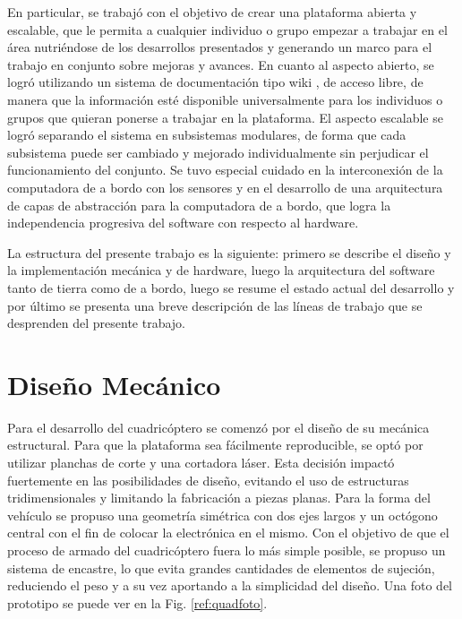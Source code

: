 \documentclass[a4paper, conference]{IEEEtran}
\begin{document}
En particular, se trabajó con el objetivo de crear una plataforma abierta y escalable, que le permita a cualquier individuo o grupo empezar a trabajar en el área nutriéndose de los desarrollos presentados y generando un marco para el trabajo en conjunto sobre mejoras y avances. En cuanto al aspecto abierto, se logró utilizando un sistema de documentación tipo wiki \cite{wiki}, de acceso libre, de manera que la información esté disponible universalmente para los individuos o grupos que quieran ponerse a trabajar en la plataforma. El aspecto escalable se logró separando el sistema en subsistemas modulares, de forma que cada subsistema puede ser cambiado y mejorado individualmente sin perjudicar el funcionamiento del conjunto. Se tuvo especial cuidado en la interconexión de la computadora de a bordo con los sensores y en el desarrollo de una arquitectura de capas de abstracción para la computadora de a bordo, que logra la independencia progresiva del software con respecto al hardware. 

La estructura del presente trabajo es la siguiente: primero se describe el diseño y la implementación mecánica y de hardware, luego la arquitectura del software tanto de tierra como de a bordo, luego se resume el estado actual del desarrollo y por último se presenta una breve descripción de las líneas de trabajo que se desprenden del presente trabajo.

\vspace{5 mm}

\section{Diseño Mecánico}

Para el desarrollo del cuadricóptero se comenzó por el diseño de su mecánica estructural. Para que la plataforma sea fácilmente reproducible, se optó por utilizar planchas de corte y una cortadora láser. Esta decisión impactó fuertemente en las posibilidades de diseño, evitando el uso de estructuras tridimensionales y limitando la fabricación a piezas planas. Para la forma del vehículo se propuso una geometría simétrica con dos ejes largos y un octógono central con el fin de colocar la electrónica en el mismo. Con el objetivo de que el proceso de armado del cuadricóptero fuera lo más simple posible, se propuso un sistema de encastre, lo que evita grandes cantidades de elementos de sujeción, reduciendo el peso y a su vez aportando a la simplicidad del diseño. Una foto del prototipo se puede ver en la Fig. \ref{ref:quadfoto}.
\end{document}
